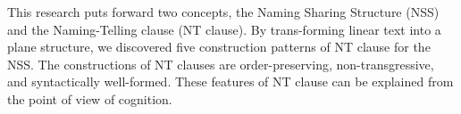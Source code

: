 This research puts forward two concepts, the Naming Sharing Structure (NSS) and the Naming-Telling clause (NT clause). By trans-forming linear text into a plane structure, we discovered five construction patterns of NT clause for the NSS. The constructions of NT clauses are order-preserving, non-transgressive, and syntactically well-formed. These features of NT clause can be explained from the point of view of cognition.
